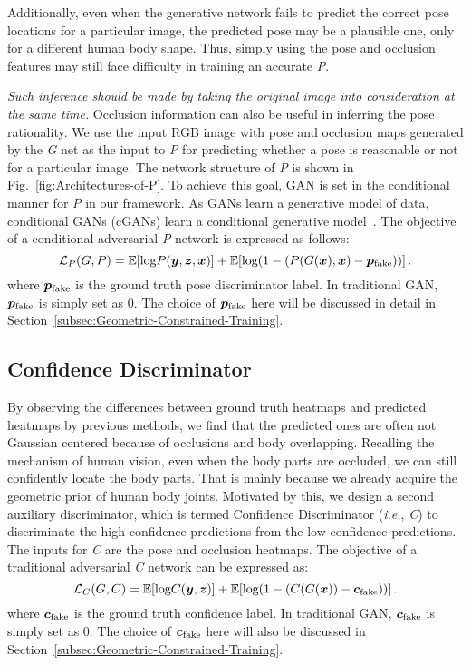 \documentclass[10pt,letterpaper,twocolumn]{article}
\begin{document}
Additionally, even when the generative network fails to predict the correct pose locations for a particular image, the predicted pose may be a plausible one, only for a different human body shape. Thus, simply using the pose and occlusion features may still face difficulty in training an accurate \textit{P}.

{\it Such inference should be made by taking the original image into consideration at the same time.} Occlusion information can also be useful in inferring the pose rationality. We use the input RGB image with pose and occlusion maps generated by the \textit{G} net as the input to \textit{P} for predicting whether a pose is reasonable or not for a particular image. The network structure of \textit{P} is shown in Fig.~\ref{fig:Architectures-of-P}.
To achieve this goal, GAN is set in the conditional manner for \textit{P} in our framework. As GANs learn a generative model of data, conditional GANs (cGANs) learn a conditional generative model~\cite{conf/nips/GoodfellowPMXWOCB14}. The objective of a conditional adversarial \textit{P} network is expressed as follows:
\begin{equation}
\label{eq:disP}
\mathcal{L}_{P}(G,P)=\mathbb{E}[\textrm{log}P(\bm{y},\bm{z},\bm{x})]+\mathbb{E}[\textrm{log}(1-(P(G(\bm{x}),\bm{x})-\bm{p}_{\rm  fake}))] \,.
\end{equation}
where $\bm{p}_{\rm  fake}$ is the ground truth pose discriminator label. In traditional GAN,  $\bm{p}_{\rm  fake}$ is simply set as 0. The choice of $\bm{p}_{\rm  fake}$ here will be discussed in detail in Section~\ref{subsec:Geometric-Constrained-Training}.

\subsection{Confidence Discriminator\label{subsec:Confidence-Discriminator}}

By observing the differences between ground truth heatmaps and predicted heatmaps by previous methods, we find that the predicted ones are often
not Gaussian centered because of occlusions and body overlapping. Recalling the mechanism of human vision, even when the body parts are occluded,
we can still confidently locate the body parts. That is mainly because we already acquire  the geometric prior of human body joints. Motivated by this, we design a second  auxiliary discriminator, which is termed Confidence Discriminator (\emph{i.e.}, \textit{C}) to discriminate the high-confidence predictions from the low-confidence predictions. The inputs for \textit{C} are the pose and occlusion heatmaps. The objective of a traditional adversarial \textit{C} network can be expressed as:
\begin{equation}
\label{eq:disC}
\mathcal{L}_{C}(G,C)=\mathbb{E}[\textrm{log}C(\bm{y},\bm{z})]+\mathbb{E}[\textrm{log}(1-(C(G(\bm{x}))-\bm{c}_{\rm  fake}))] \,.
\end{equation}
where $\bm{c}_{\rm  fake}$ is the ground truth confidence label. In traditional GAN,  $\bm{c}_{\rm  fake}$ is simply set as 0. The choice of $\bm{c}_{\rm  fake}$ here will also be discussed in Section~\ref{subsec:Geometric-Constrained-Training}.
\end{document}
